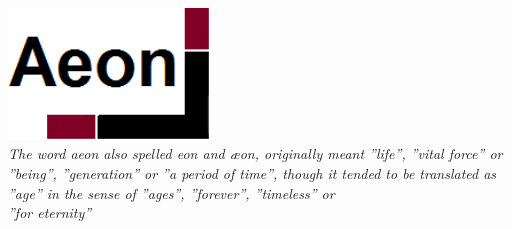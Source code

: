 \vspace*{\fill}

\begin{minipage}{.85\linewidth}
\begin{center}

	\includegraphics[width=0.4\textwidth]{../Templates/Aeonbig.png}\\[2cm]
	
\emph{The word aeon also spelled eon and æon, originally meant ''life'', ''vital force'' or ''being'', ''generation'' or ''a period of time'', though it tended to be translated as ''age'' in the sense of ''ages'', ''forever'', ''timeless'' or \\ ''for eternity''} %

\end{center}
\end{minipage}
\vspace*{\fill}

\clearpage
